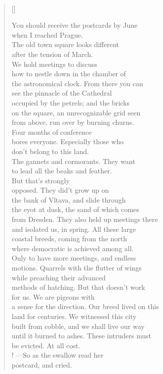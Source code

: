 \documentclass{book}
\begin{document}
\newpage
\poemtitle{\textcolor[RGB]{165,15,15}{The Alternative Spring}}
\hspace*{\fill} \\
\settowidth{\versewidth}{a sense for the direction. Our breed lived on this }
\begin{verse}[\versewidth]

    You should receive the postcards by June\\
    when I reached Prague. \\
    The old town square looks different\\
    after the tension of March. \\
    We hold meetings to discuss\\
    how to nestle down in the chamber of\\
    the astronomical clock. From there you can\\
    see the pinnacle of the Cathedral\\
    occupied by the petrels; and the bricks\\
    on the square, an unrecognizable grid seen\\
    from above, run over by burning churns. \\
    Four months of conference\\
    bores everyone. Especially those who \\
    don't belong to this land. \\
    The gannets and cormorants. They want\\
    to lead all the beaks and feather. \\
    But that's strongly\\
    opposed. They did't grow up on\\
    the bank of Vltava, and slide through\\
    the eyot at dusk, the sand of which comes\\
    from Dresden. They also held up meetings there\\
    and isolated us, in spring. All these large\\
    coastal breeds, coming from the north\\
    where democratic is achieved among all.\\
    Only to have more meetings, and endless\\
    motions. Quarrels with the flutter of wings\\
    while preaching their advanced\\
    methods of hatching. But that doesn't work\\
    for us. We are pigeons with\\
    a sense for the direction. Our breed lived on this \\
    land for centuries. We witnessed this city\\
    built from cobble, and we shall live our way\\
    until it burned to ashes. These intruders must\\
    be evicted. At all cost. \\! 
    ---So as the swallow read her \\
    postcard, and cried.
\end{verse}
\end{document}
